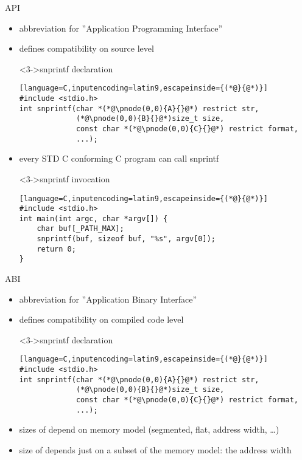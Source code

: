 \documentclass[ngerman,xcolor={table,dvipsnames},smaller,compress,hyperref={bookmarks,colorlinks}]{beamer}%
\begin{document}
\begin{frame}[fragile]{API}
\begin{itemize}
\item abbreviation for ''Application Programming Interface''
\item<2-> defines compatibility on source level

\begin{block}<3->{snprintf declaration}
\scriptsize
\begin{lstlisting}[language=C,inputencoding=latin9,escapeinside={(*@}{@*)}]
#include <stdio.h>
int snprintf(char *(*@\pnode(0,0){A}{}@*) restrict str,
             (*@\pnode(0,0){B}{}@*)size_t size,
             const char *(*@\pnode(0,0){C}{}@*) restrict format,
             ...);
\end{lstlisting}
\end{block}

\item<4-> every STD C conforming C program can call snprintf

\begin{block}<3->{snprintf invocation}
\scriptsize
\begin{lstlisting}[language=C,inputencoding=latin9,escapeinside={(*@}{@*)}]
#include <stdio.h>
int main(int argc, char *argv[]) {
    char buf[_PATH_MAX];
    snprintf(buf, sizeof buf, "%s", argv[0]);
    return 0;
}
\end{lstlisting}
\end{block}
\end{itemize}
\end{frame}

\begin{frame}[fragile]{ABI}
\begin{itemize}
\item abbreviation for ''Application Binary Interface''
\item<2-> defines compatibility on compiled code level

\begin{block}<3->{snprintf declaration}
\scriptsize
\begin{lstlisting}[language=C,inputencoding=latin9,escapeinside={(*@}{@*)}]
#include <stdio.h>
int snprintf(char *(*@\pnode(0,0){A}{}@*) restrict str,
             (*@\pnode(0,0){B}{}@*)size_t size,
             const char *(*@\pnode(0,0){C}{}@*) restrict format,
             ...);
\end{lstlisting}
\end{block}

\item<4-> sizes of  depend on memory model (segmented, flat, address width, \ldots)

\item<5-> size of  depends just on a subset of the memory model: the address width

\end{itemize}
\end{frame}
\end{document}
